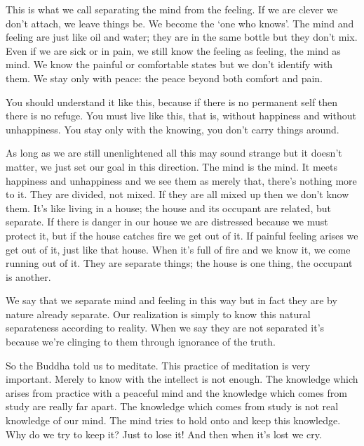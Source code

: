 This is what we call separating the mind from the feeling. If we are clever we don't attach, we leave things be. We become the `one who knows'. The mind and feeling are just like oil and water; they are in the same bottle but they don't mix. Even if we are sick or in pain, we still know the feeling as feeling, the mind as mind. We know the painful or comfortable states but we don't identify with them. We stay only with peace: the peace beyond both comfort and pain. 

You should understand it like this, because if there is no permanent self then there is no refuge. You must live like this, that is, without happiness and without unhappiness. You stay only with the knowing, you don't carry things around. 

As long as we are still unenlightened all this may sound strange but it doesn't matter, we just set our goal in this direction. The mind is the mind. It meets happiness and unhappiness and we see them as merely that, there's nothing more to it. They are divided, not mixed. If they are all mixed up then we don't know them. It's like living in a house; the house and its occupant are related, but separate. If there is danger in our house we are distressed because we must protect it, but if the house catches fire we get out of it. If painful feeling arises we get out of it, just like that house. When it's full of fire and we know it, we come running out of it. They are separate things; the house is one thing, the occupant is another. 

We say that we separate mind and feeling in this way but in fact they are by nature already separate. Our realization is simply to know this natural separateness according to reality. When we say they are not separated it's because we're clinging to them through ignorance of the truth. 

So the Buddha told us to meditate. This practice of meditation is very important. Merely to know with the intellect is not enough. The knowledge which arises from practice with a peaceful mind and the knowledge which comes from study are really far apart. The knowledge which comes from study is not real knowledge of our mind. The mind tries to hold onto and keep this knowledge. Why do we try to keep it? Just to lose it! And then when it's lost we cry. 

